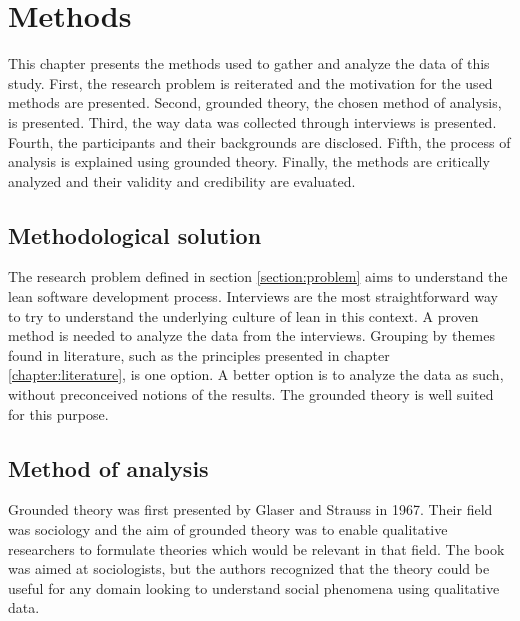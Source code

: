 
\chapter{Methods}
\label{chapter:methods}


This chapter presents the methods used to gather and analyze the data of this study. First, the research problem is reiterated and the motivation for the used methods are presented. Second, grounded theory, the chosen method of analysis, is presented. Third, the way data was collected through interviews is presented. Fourth, the participants and their backgrounds are disclosed. Fifth, the process of analysis is explained using grounded theory. Finally, the methods are critically analyzed and their validity and credibility are evaluated.

\section{Methodological solution}
\label{section:methodsolution}


The research problem defined in section \ref{section:problem} aims to understand the lean software development process. Interviews are the most straightforward way to try to understand the underlying culture of lean in this context. A proven method is needed to analyze the data from the interviews. Grouping by themes found in literature, such as the principles presented in chapter \ref{chapter:literature}, is one option. A better option is to analyze the data as such, without preconceived notions of the results. The grounded theory is well suited for this purpose.

\section{Method of analysis}
\label{section:methodanalysis}


Grounded theory was first presented by Glaser and Strauss in 1967. Their field was sociology and the aim of grounded theory was to enable qualitative researchers to formulate theories which would be relevant in that field. The book was aimed at sociologists, but the authors recognized that the theory could be useful for any domain looking to understand social phenomena using qualitative data. \cite{glaser1967discovery}


